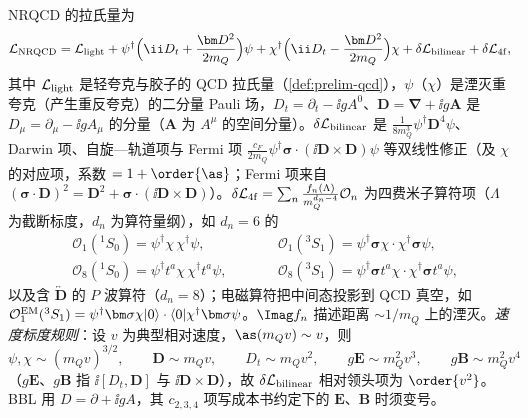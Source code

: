 \begin{definition}\label{def:heavy-nrqcd}
NRQCD 的拉氏量为
\begin{equation}\label{eq:heavy-LNRQCD}
\mathcal L_{\rm NRQCD}=\mathcal L_{\rm light}+\psi^\dagger\Big(\ii D_t+\frac{\bm D^2}{2m_Q}\Big)\psi+\chi^\dagger\Big(\ii D_t-\frac{\bm D^2}{2m_Q}\Big)\chi+\delta\mathcal L_{\rm bilinear}+\delta\mathcal L_{\rm 4f},
\end{equation}
其中 $\mathcal L_{\rm light}$ 是轻夸克与胶子的 QCD 拉氏量（\cref{def:prelim-qcd}），$\psi$（$\chi$）是湮灭重夸克（产生重反夸克）的二分量 Pauli 场，$D_t=\partial_t-\ii gA^0$、$\bm D=\bm\nabla+\ii g\bm A$ 是 $D_\mu=\partial_\mu-\ii gA_\mu$ 的分量（$\bm A$ 为 $A^\mu$ 的空间分量）。$\delta\mathcal L_{\rm bilinear}$ 是 $\frac{1}{8m_Q^3}\psi^\dagger\bm D^4\psi$、Darwin 项、自旋—轨道项与 Fermi 项 $\frac{c_F}{2m_Q}\psi^\dagger\bm\sigma\cdot(\ii\bm D\times\bm D)\psi$ 等双线性修正（及 $\chi$ 的对应项，系数 $=1+\order{\as}$；Fermi 项来自 $(\bm\sigma\cdot\bm D)^2=\bm D^2+\bm\sigma\cdot(\ii\bm D\times\bm D)$）。$\delta\mathcal L_{\rm 4f}=\sum_n\frac{f_n(\Lambda)}{m_Q^{d_n-4}}\mathcal O_n$ 为四费米子算符项（$\Lambda$ 为截断标度，$d_n$ 为算符量纲），如 $d_n=6$ 的
\begin{equation}\label{eq:heavy-4f}
\begin{aligned}
&\mathcal O_1({}^1S_0)=\psi^\dagger\chi\,\chi^\dagger\psi,&\qquad&\mathcal O_1({}^3S_1)=\psi^\dagger\bm\sigma\chi\cdot\chi^\dagger\bm\sigma\psi,\\
&\mathcal O_8({}^1S_0)=\psi^\dagger t^a\chi\,\chi^\dagger t^a\psi,&\qquad&\mathcal O_8({}^3S_1)=\psi^\dagger\bm\sigma t^a\chi\cdot\chi^\dagger\bm\sigma t^a\psi,
\end{aligned}
\end{equation}
以及含 $\overleftrightarrow{\bm D}$ 的 $P$ 波算符（$d_n=8$）；电磁算符把中间态投影到 QCD 真空，如 $\mathcal O^{\rm EM}_1({}^3S_1)=\psi^\dagger\bm\sigma\chi|0\rangle\cdot\langle0|\chi^\dagger\bm\sigma\psi$。$\Imag f_n$ 描述距离 $\sim1/m_Q$ 上的湮灭。\emph{速度标度规则}：设 $v$ 为典型相对速度，$\as(m_Qv)\sim v$，则
\begin{equation}\label{eq:heavy-vscaling}
\psi,\chi\sim(m_Qv)^{3/2},\qquad \bm D\sim m_Qv,\qquad D_t\sim m_Qv^2,\qquad g\bm E\sim m_Q^2v^3,\qquad g\bm B\sim m_Q^2v^4
\end{equation}
（$g\bm E$、$g\bm B$ 指 $\ii[D_t,\bm D]$ 与 $\ii\bm D\times\bm D$），故 $\delta\mathcal L_{\rm bilinear}$ 相对领头项为 $\order{v^2}$。BBL 用 $D=\partial+\ii gA$，其 $c_{2,3,4}$ 项写成本书约定下的 $\bm E$、$\bm B$ 时须变号。
\end{definition}

